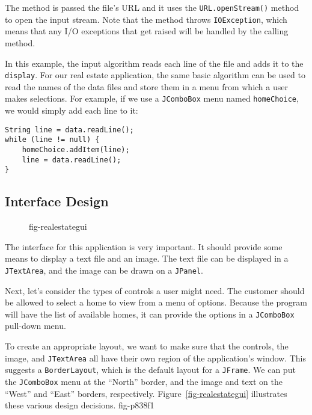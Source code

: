 {\noindent The method is passed the file's URL and it uses the
{\tt URL.openStream()} method to open the input stream.  Note
that the method throws \mbox{\tt IOException}, which means that
any I/O exceptions that get raised will be handled by the calling
method.

In this example, the input algorithm reads each line of the file and
adds it to the {\tt display}.  For our real estate application, the
same basic algorithm can be used to read the names of the data files
and store them in a menu from which a user makes selections.  For
example, if we use a {\tt JComboBox} menu named {\tt homeChoice}, we
would simply add each line to it:

\begin{jjjlisting}
\begin{lstlisting}
String line = data.readLine();
while (line != null) {
    homeChoice.addItem(line);
    line = data.readLine();
}
\end{lstlisting}
\end{jjjlisting}

\subsection*{Interface Design}

\begin{figure}[tb]
 {fig-realestategui}
\end{figure}

\noindent The interface for this application is very important.  It
should provide some means to display a text file and an image.  The
text file can be displayed in a {\tt JTextArea}, and the image  can
be drawn on a {\tt JPanel}.

Next, let's consider the types of controls a user might need. The
customer should be allowed to select a home to view from a menu of
options.  Because the program will have the list of available homes,
it can provide the options in a {\tt JComboBox} pull-down menu.

To create an appropriate layout, we want to make sure that the
controls, the image, and {\tt JTextArea} all have their own region of
the application's window.  This suggests a {\tt BorderLayout}, which is
the default layout for a {\tt JFrame}.  We can put the {\tt JComboBox}
menu at the ``North'' border, and the image and text on the ``West''
and ``East'' borders, respectively.  Figure~\ref{fig-realestategui}
illustrates these various design decisions.
{fig-p838f1}

}
